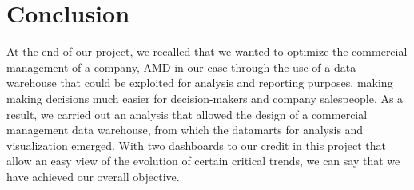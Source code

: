 \chapter*{Conclusion}

At the end of our project, we recalled that we wanted to optimize the commercial management of a company, AMD in our case through the use of a data warehouse that could be exploited for analysis and reporting purposes, making making decisions much easier for decision-makers and company salespeople. As a result, we carried out an analysis that allowed the design of a commercial management data warehouse, from which the datamarts for analysis and visualization emerged. With two dashboards to our credit in this project that allow an easy view of the evolution of certain critical trends, we can say that we have achieved our overall objective.

